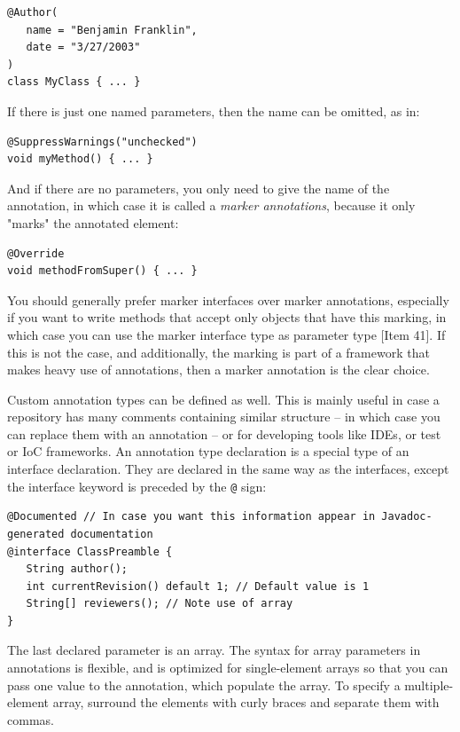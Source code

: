 \documentclass[table, xcdraw]{article}%
\begin{document}
\begin{verbatim}
@Author(
   name = "Benjamin Franklin",
   date = "3/27/2003"
)
class MyClass { ... }
\end{verbatim}

If there is just one named parameters, then the name can be omitted, as in:

\begin{verbatim}
@SuppressWarnings("unchecked")
void myMethod() { ... }
\end{verbatim}

And if there are no parameters, you only need to give the name of the annotation, in which case it is called a \emph{marker annotations}, because it only "marks" the annotated element:

\begin{verbatim}
@Override
void methodFromSuper() { ... }
\end{verbatim}

You should generally prefer marker interfaces over marker annotations, especially if you want to write methods that accept only objects that have this marking, in which case you can use the marker interface type as parameter type [Item 41]. If this is not the case, and additionally, the marking is part of a framework that makes heavy use of annotations, then a marker annotation is the clear choice.

Custom annotation types can be defined as well. This is mainly useful in case a repository has many comments containing similar structure -- in which case you can replace them with an annotation -- or for developing tools like IDEs, or test or IoC frameworks. An annotation type declaration is a special type of an interface declaration. They are declared in the same way as the interfaces, except the interface keyword is preceded by the \texttt{@} sign:

\begin{verbatim}
@Documented // In case you want this information appear in Javadoc-generated documentation
@interface ClassPreamble {
   String author();
   int currentRevision() default 1; // Default value is 1
   String[] reviewers(); // Note use of array
}
\end{verbatim}

The last declared parameter is an array. The syntax for array parameters in annotations is flexible, and is optimized for single-element arrays so that you can pass one value to the annotation, which populate the array. To specify a multiple-element array, surround the elements with curly braces and separate them with commas.
\end{document}
